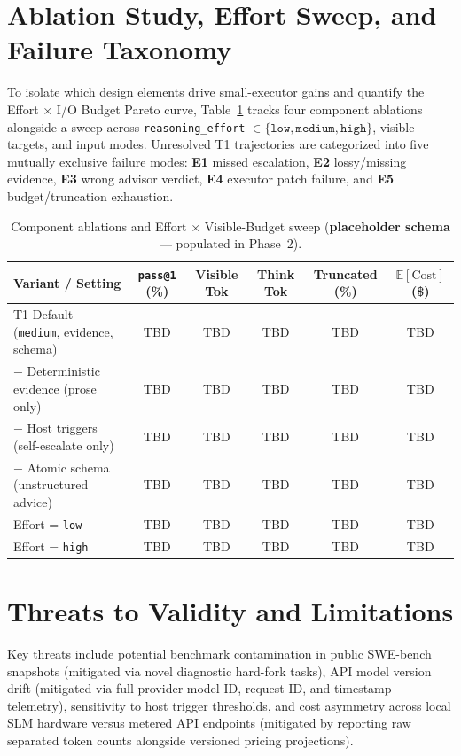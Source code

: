\documentclass[11pt]{article}
\begin{document}
\section{Ablation Study, Effort Sweep, and Failure Taxonomy}
\label{sec:ablations}

To isolate which design elements drive small-executor gains and quantify the Effort $\times$ I/O Budget Pareto curve, Table~\ref{tab:ablations} tracks four component ablations alongside a sweep across \texttt{reasoning\_effort} $\in \{\texttt{low}, \texttt{medium}, \texttt{high}\}$, visible targets, and input modes. Unresolved T1 trajectories are categorized into five mutually exclusive failure modes: \textbf{E1} missed escalation, \textbf{E2} lossy/missing evidence, \textbf{E3} wrong advisor verdict, \textbf{E4} executor patch failure, and \textbf{E5} budget/truncation exhaustion.

\begin{table}[t]
\centering
\caption{Component ablations and Effort $\times$ Visible-Budget sweep (\textbf{placeholder schema} --- populated in Phase~2).}
\label{tab:ablations}
\begin{tabular}{@{}lccccc@{}}
\toprule
Variant / Setting & \texttt{pass@1} (\%) & Visible Tok & Think Tok & Truncated (\%) & $\mathbb{E}[\text{Cost}]$ (\$) \\
\midrule
T1 Default (\texttt{medium}, evidence, schema) & TBD & TBD & TBD & TBD & TBD \\
\quad $-$ Deterministic evidence (prose only)      & TBD & TBD & TBD & TBD & TBD \\
\quad $-$ Host triggers (self-escalate only)     & TBD & TBD & TBD & TBD & TBD \\
\quad $-$ Atomic schema (unstructured advice)    & TBD & TBD & TBD & TBD & TBD \\
\quad Effort = \texttt{low}                      & TBD & TBD & TBD & TBD & TBD \\
\quad Effort = \texttt{high}                     & TBD & TBD & TBD & TBD & TBD \\
\bottomrule
\end{tabular}
\end{table}

\section{Threats to Validity and Limitations}
\label{sec:threats}

Key threats include potential benchmark contamination in public SWE-bench snapshots (mitigated via novel diagnostic hard-fork tasks), API model version drift (mitigated via full provider model ID, request ID, and timestamp telemetry), sensitivity to host trigger thresholds, and cost asymmetry across local SLM hardware versus metered API endpoints (mitigated by reporting raw separated token counts alongside versioned pricing projections).
\end{document}
